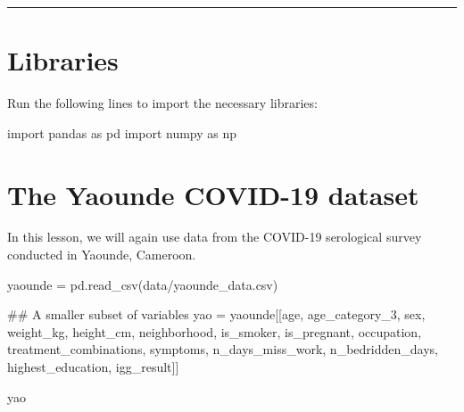 \documentclass[
  letterpaper,
  DIV=11,
  numbers=noendperiod]{scrreprt}
\newenvironment{Shaded}{\begin{snugshade}}{\end{snugshade}}
\newcommand{\CommentTok}[1]{\textcolor[rgb]{0.37,0.37,0.37}{#1}}
\newcommand{\ImportTok}[1]{\textcolor[rgb]{0.00,0.46,0.62}{#1}}
\newcommand{\NormalTok}[1]{\textcolor[rgb]{0.00,0.23,0.31}{#1}}
\newcommand{\OperatorTok}[1]{\textcolor[rgb]{0.37,0.37,0.37}{#1}}
\newcommand{\StringTok}[1]{\textcolor[rgb]{0.13,0.47,0.30}{#1}}
\begin{document}
\begin{center}\rule{0.5\linewidth}{0.5pt}\end{center}

\section{Libraries}\label{libraries}

Run the following lines to import the necessary libraries:

\begin{Shaded}
\begin{Highlighting}[]
\ImportTok{import}\NormalTok{ pandas }\ImportTok{as}\NormalTok{ pd}
\ImportTok{import}\NormalTok{ numpy }\ImportTok{as}\NormalTok{ np}
\end{Highlighting}
\end{Shaded}

\section{The Yaounde COVID-19
dataset}\label{the-yaounde-covid-19-dataset-2}

In this lesson, we will again use data from the COVID-19 serological
survey conducted in Yaounde, Cameroon.

\begin{Shaded}
\begin{Highlighting}[]
\NormalTok{yaounde }\OperatorTok{=}\NormalTok{ pd.read\_csv(}\StringTok{\textquotesingle{}data/yaounde\_data.csv\textquotesingle{}}\NormalTok{)}

\CommentTok{\#\# A smaller subset of variables}
\NormalTok{yao }\OperatorTok{=}\NormalTok{ yaounde[[}\StringTok{\textquotesingle{}age\textquotesingle{}}\NormalTok{, }\StringTok{\textquotesingle{}age\_category\_3\textquotesingle{}}\NormalTok{, }\StringTok{\textquotesingle{}sex\textquotesingle{}}\NormalTok{, }\StringTok{\textquotesingle{}weight\_kg\textquotesingle{}}\NormalTok{, }\StringTok{\textquotesingle{}height\_cm\textquotesingle{}}\NormalTok{,}
               \StringTok{\textquotesingle{}neighborhood\textquotesingle{}}\NormalTok{, }\StringTok{\textquotesingle{}is\_smoker\textquotesingle{}}\NormalTok{, }\StringTok{\textquotesingle{}is\_pregnant\textquotesingle{}}\NormalTok{, }\StringTok{\textquotesingle{}occupation\textquotesingle{}}\NormalTok{,}
               \StringTok{\textquotesingle{}treatment\_combinations\textquotesingle{}}\NormalTok{, }\StringTok{\textquotesingle{}symptoms\textquotesingle{}}\NormalTok{, }\StringTok{\textquotesingle{}n\_days\_miss\_work\textquotesingle{}}\NormalTok{, }\StringTok{\textquotesingle{}n\_bedridden\_days\textquotesingle{}}\NormalTok{,}
               \StringTok{\textquotesingle{}highest\_education\textquotesingle{}}\NormalTok{, }\StringTok{\textquotesingle{}igg\_result\textquotesingle{}}\NormalTok{]]}

\NormalTok{yao}
\end{Highlighting}
\end{Shaded}
\end{document}
